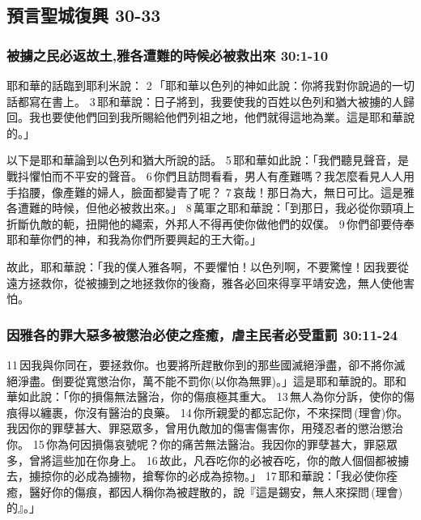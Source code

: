 \subsection{預言聖城復興 30-33}
\subsubsection{被擄之民必返故土,雅各遭難的時候必被救出來 30:1-10}
耶和華的話臨到耶利米說： 2 「耶和華以色列的神如此說：你將我對你說過的一切話都寫在書上。 3 耶和華說：日子將到，我要使我的百姓以色列和猶大被擄的人歸回。我也要使他們回到我所賜給他們列祖之地，他們就得這地為業。這是耶和華說的。」

以下是耶和華論到以色列和猶大所說的話。 5 耶和華如此說：「我們聽見聲音，是戰抖懼怕而不平安的聲音。 6 你們且訪問看看，男人有產難嗎？我怎麼看見人人用手掐腰，像產難的婦人，臉面都變青了呢？ 7 哀哉！那日為大，無日可比。這是雅各遭難的時候，但他必被救出來。」 8 萬軍之耶和華說：「到那日，我必從你頸項上折斷仇敵的軛，扭開他的繩索，外邦人不得再使你做他們的奴僕。 9 你們卻要侍奉耶和華你們的神，和我為你們所要興起的王大衛。」

故此，耶和華說：「我的僕人雅各啊，不要懼怕！以色列啊，不要驚惶！因我要從遠方拯救你，從被擄到之地拯救你的後裔，雅各必回來得享平靖安逸，無人使他害怕。 


\subsubsection{因雅各的罪大惡多被懲治必使之痊癒，虐主民者必受重罰 30:11-24}
11 因我與你同在，要拯救你。也要將所趕散你到的那些國滅絕淨盡，卻不將你滅絕淨盡。倒要從寬懲治你，萬不能不罰你(以你為無罪)。」這是耶和華說的。耶和華如此說：「你的損傷無法醫治，你的傷痕極其重大。 13 無人為你分訴，使你的傷痕得以纏裹，你沒有醫治的良藥。 14 你所親愛的都忘記你，不來探問 (理會)你。我因你的罪孽甚大、罪惡眾多，曾用仇敵加的傷害傷害你，用殘忍者的懲治懲治你。 15 你為何因損傷哀號呢？你的痛苦無法醫治。我因你的罪孽甚大，罪惡眾多，曾將這些加在你身上。 16 故此，凡吞吃你的必被吞吃，你的敵人個個都被擄去，擄掠你的必成為擄物，搶奪你的必成為掠物。」 17 耶和華說：「我必使你痊癒，醫好你的傷痕，都因人稱你為被趕散的，說『這是錫安，無人來探問 (理會)的』。」


